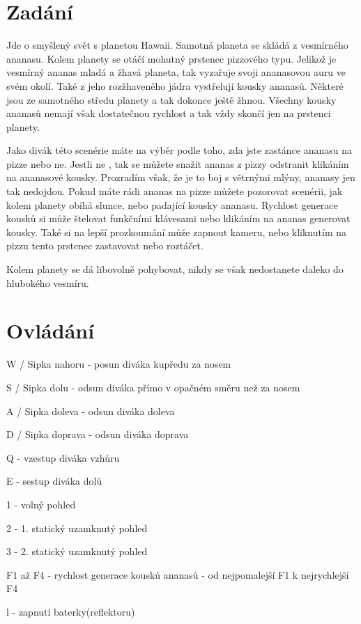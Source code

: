 \hypertarget{index_Zadání}{}\section{Zadání}\label{index_Zadání}
Jde o smyšlený svět s planetou Hawaii. Samotná planeta se skládá z vesmírného ananasu. Kolem planety se otáčí mohutný prstenec pizzového typu. Jelikož je vesmírný ananas mladá a žhavá planeta, tak vyzařuje svoji ananasovou auru ve svém okolí. Také z jeho rozžhaveného jádra vystřelují kousky ananasů. Některé jsou ze samotného středu planety a tak dokonce ještě žhnou. Všechny kousky ananasů nemají však dostatečnou rychlost a tak vždy skončí jen na prstenci planety.

Jako divák této scenérie máte na výběr podle toho, zda jste zastánce ananasu na pizze nebo ne. Jestli ne , tak se můžete snažit ananas z pizzy odstranit klikáním na ananasové kousky. Prozradím však, že je to boj s větrnými mlýny, ananasy jen tak nedojdou. Pokud máte rádi ananas na pizze můžete pozorovat scenérii, jak kolem planety obíhá slunce, nebo padající kousky ananasu. Rychlost generace kousků si může štelovat funkčními klávesami nebo klikáním na ananas generovat kousky. Také si na lepší prozkoumání může zapnout kameru, nebo kliknutím na pizzu tento prstenec zastavovat nebo roztáčet.

Kolem planety se dá libovolně pohybovat, nikdy se však nedostanete daleko do hlubokého vesmíru.\hypertarget{index_Ovládání}{}\section{Ovládání}\label{index_Ovládání}
W / Sipka nahoru -\/ posun diváka kupředu za nosem

S / Sipka dolu -\/ odsun diváka přímo v opačném směru než za nosem

A / Sipka doleva -\/ odsun diváka doleva

D / Sipka doprava -\/ odsun diváka doprava

Q -\/ vzestup diváka vzhůru

E -\/ sestup diváka dolů

1 -\/ volný pohled

2 -\/ 1. statický uzamknutý pohled

3 -\/ 2. statický uzamknutý pohled

F1 až F4 -\/ rychlost generace kousků ananasů -\/ od nejpomalejší F1 k nejrychlejší F4

l -\/ zapnutí baterky(reflektoru)

